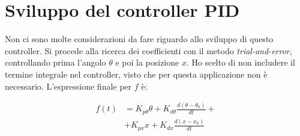 \section{Sviluppo del controller \textsc{PID}}\label{sec:pid}
Non ci sono molte considerazioni da fare riguardo allo sviluppo di questo controller.
Si procede alla ricerca dei coefficienti con il metodo \emph{trial-and-error}, controllando prima l'angolo $\theta$ e
poi la posizione $x$.
Ho scelto di non includere il termine integrale nel controller, visto che per questa applicazione non è necessario.
L'espressione finale per $f$ è:

\begin{equation}
  \begin{aligned}
  f(t) &= K_{p\theta}\theta + K_{d\theta}\frac{d(\theta - \theta_0)}{dt} +\\
  &+ K_{px}x + K_{dx}\frac{d(x - x_0)}{dt}
  \end{aligned}
  \label{eq:pid-control}
\end{equation}

